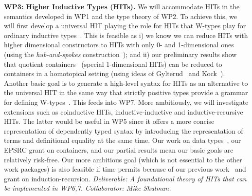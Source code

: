 \documentclass[a4paper,11pt]{article}
\begin{document}
{\bf WP3: Higher Inductive Types (HITs).}  We will accommodate HITs in
the semantics developed in WP1 and the type theory of WP2. To
achieve this, we will first develop a universal HIT playing the role
for HITs that W-types play for ordinary inductive
types~\cite{alti:cont-tcs}. This is feasible as i) we know we can
reduce HITs with higher dimensional constructors to HITs with only 0-
and 1-dimensional ones (using the \emph{hub-and-spokes}
construction~\cite{hott-book}); and ii) our preliminary results show
that quotient containers~\cite{alti:mpc04} (special 1-dimensional
HITs) can be reduced to containers in a homotopical setting (using
ideas of Gylterud~\cite{gylterud:thesis} and
Kock~\cite{kock:groupoids}).  Another basic goal is to generate a
high-level syntax for HITs as an alternative to the universal HIT in
the same way that strictly positive types provide a grammar for
defining W-types~\cite{alti:cont-tcs}.  This feeds into WP7.  More
ambitiously, we will investigate extensions such as coinductive HITs,
inductive-inductive and inductive-recursive HITs. The latter would be
useful in WP5 since it offers a more concise representation of
dependently typed syntax by introducing the representation of terms
and definitional equality at the same time.  Our work on data
types~\cite{alti:cont-tcs, alti:mpc04,
  altenkirchGhaniHancockMcBrideMorris:indexedContainers,
  GambinoN:polfpm,awodeyGamSoja:indTypesInHTT},
our EPSRC grant on containers, and our partial results 
mean our basic goals are relatively risk-free.
Our more ambitious goal (which is not essential to the other work packages) is also feasible if time
permits because of our previous work~\cite{alti:catind2,ghani:fibredIR}
and grant on induction-recursion. {\em Deliverable: A foundational theory of HITs that 
  can be implemented in WP6,7.
  Collaborator: Mike Shulman.  }
\end{document}
